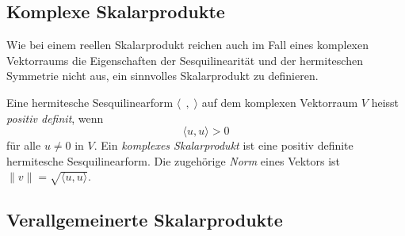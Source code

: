 %
%
\subsection{Komplexe Skalarprodukte}
Wie bei einem reellen Skalarprodukt reichen auch im Fall eines
komplexen Vektorraums die Eigenschaften der Sesquilinearität
und der hermiteschen Symmetrie nicht aus, ein sinnvolles
Skalarprodukt zu definieren.

\begin{definition}
Eine hermitesche Sesquilinearform $\langle\;\,,\;\rangle$
auf dem komplexen Vektorraum $V$ heisst {\em positiv definit}, wenn
\[
\langle u,u\rangle > 0
\]
für alle $u\ne 0$ in $V$.
Ein {\em komplexes Skalarprodukt} ist eine positiv definite hermitesche
Sesquilinearform.
Die zugehörige {\em Norm} eines Vektors ist
$\|v\| = \sqrt{\langle u, u\rangle}$.
\end{definition}


%
%
\subsection{Verallgemeinerte Skalarprodukte}


